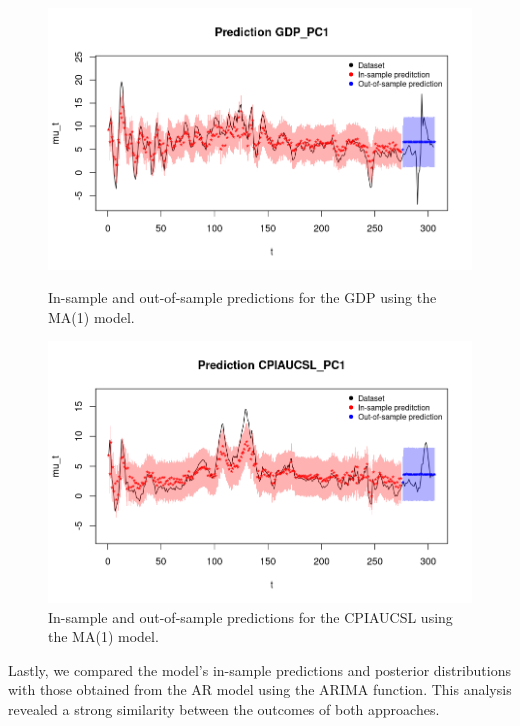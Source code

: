 \begin{figure}[H]
    \centering
    \begin{minipage}{0.49\textwidth}
        \centering
        \includegraphics[width=\textwidth]{images/3-MA/gdp_prediction.png}
        \caption{In-sample and out-of-sample predictions for the GDP using the MA(1) model.}
        \label{fig:MA1_gdp_prediction}
    \end{minipage}\hfill
    \begin{minipage}{0.49\textwidth}
        \centering
        \includegraphics[width=\textwidth]{images/3-MA/infl_prediction.png}
        \caption{In-sample and out-of-sample predictions for the CPIAUCSL using the MA(1) model.}
        \label{fig:MA1_infl_prediction}
    \end{minipage}
\end{figure}
Lastly, we compared the model's in-sample predictions and posterior distributions with those obtained from the AR model using the ARIMA function. This analysis revealed a strong similarity between the outcomes of both approaches.

